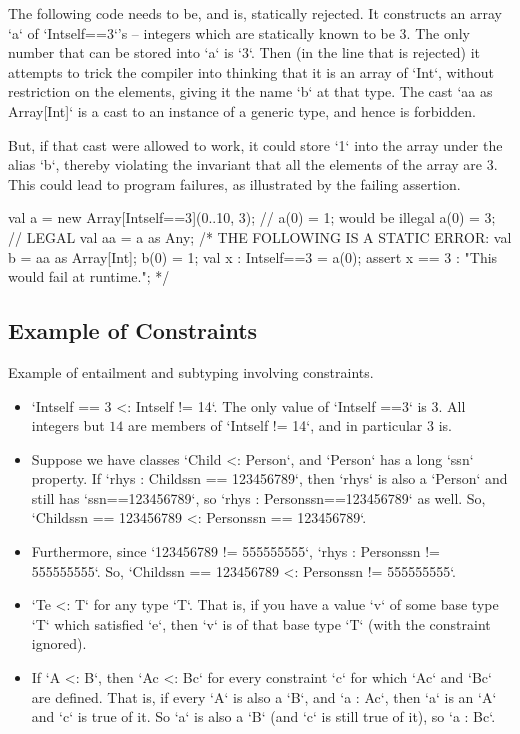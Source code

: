 \begin{ex}
The following code  needs to be, and is, statically
rejected.  It constructs an array \xcd`a` of \xcd`Int{self==3}`'s -- integers
which 
are statically known to be 3. 
The only number that can be stored into \xcd`a` is \xcd`3`.  
Then (in the line that is rejected) it attempts to trick the compiler into
thinking that it is an array of \xcd`Int`, without restriction on the
elements, giving it the name \xcd`b` at that type.  
The cast \xcd`aa as Array[Int]` is a cast to an instance of a generic type,
and hence is forbidden. 

But, if that cast were allowed to work, it could store \xcd`1` into the array
under the alias 
\xcd`b`, thereby violating 
the invariant that all the elements of the array are 3.  
This could lead to program failures, as illustrated by the failing assertion.  
\begin{xten}
  val a = new Array[Int{self==3}](0..10, 3);
  // a(0) = 1; would be illegal
  a(0) = 3; // LEGAL
  val aa = a as Any;
  /* THE FOLLOWING IS A STATIC ERROR:
  val b = aa as Array[Int];
  b(0) = 1;
  val x : Int{self==3} = a(0);
  assert x == 3 : "This would fail at runtime.";
  */
\end{xten}
\end{ex}



\subsection{Example of Constraints}
\label{ConstraintExamples}

Example of entailment and subtyping involving constraints.
\begin{itemize}
\item \xcd`Int{self == 3} <: Int{self != 14}`.  The only value of
      \xcd`Int{self ==3}` is $3$.  All integers but $14$ are members of
      \xcd`Int{self != 14}`, and in particular $3$ is.  
\item Suppose we have classes \xcd`Child <: Person`, and \xcd`Person` has a
      long \xcd`ssn` property.  If \xcd`rhys : Child{ssn == 123456789}`, then
      \xcd`rhys` is also a \xcd`Person` and still has \xcd`ssn==123456789`, so 
      \xcd`rhys : Person{ssn==123456789}` as well.  
      So, \xcd`Child{ssn == 123456789} <: Person{ssn == 123456789}`.
\item Furthermore, since \xcd`123456789 != 555555555`, 
      \xcd`rhys : Person{ssn != 555555555}`.  
      So, \xcd`Child{ssn == 123456789} <: Person{ssn != 555555555}`.  
\item \xcd`T{e} <: T` for any type \xcd`T`.  That is, if you have a value
      \xcd`v` of some base type \xcd`T` which satisfied \xcd`e`, then \xcd`v`
      is of that base type \xcd`T` (with the constraint ignored).
\item If \xcd`A <: B`, then \xcd`A{c} <: B{c}` for every constraint \xcd`{c}`
      for which \xcd`A{c}` and \xcd`B{c}` are defined.  That is, if every
      \xcd`A` is also a \xcd`B`, and \xcd`a : A{c}`, then 
      \xcd`a` is an \xcd`A` and \xcd`c` is true of it. So \xcd`a` is also a
      \xcd`B` (and \xcd`c` is still true of 
      it), so \xcd`a : B{c}`.  
\end{itemize}

